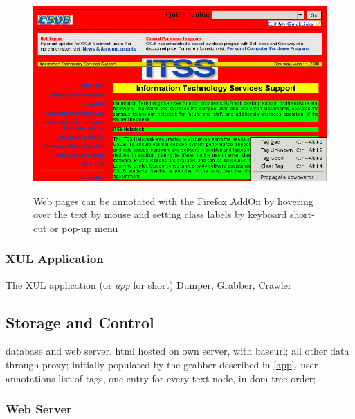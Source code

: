 \begin{figure}
	{\includegraphics[width=\textwidth]{tut0}}
\caption{\label{f:tut0}Web pages can be annotated with the \KrdWrd Firefox AddOn by hovering over the text by mouse and setting class labels by keyboard short-cut or pop-up menu}
\end{figure}


\subsubsection{XUL Application \label{app}}

The XUL application (or \textit{app} for short) 
Dumper, Grabber, Crawler


\subsection{Storage and Control}

database and web server. 
html hosted on own server, with baseurl; all other data through proxy; initially populated by the grabber described in \ref{app}.
user annotations list of tags, one entry for every text node, in dom tree order;


\subsubsection{Web Server}

